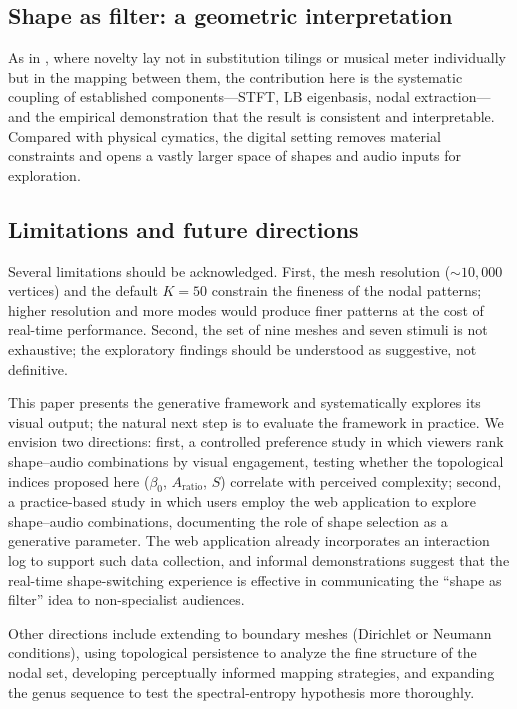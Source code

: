 \documentclass[]{interact}
\theoremstyle{plain}
\theoremstyle{definition}
\theoremstyle{remark}
\begin{document}
\subsection{Shape as filter: a geometric interpretation}

As in \citet{trevio2022}, where novelty lay not in substitution tilings or musical meter individually but in the mapping between them, the contribution here is the systematic coupling of established components---STFT, LB eigenbasis, nodal extraction---and the empirical demonstration that the result is consistent and interpretable. Compared with physical cymatics, the digital setting removes material constraints and opens a vastly larger space of shapes and audio inputs for exploration.

\subsection{Limitations and future directions}

Several limitations should be acknowledged. First, the mesh resolution (${\sim}10{,}000$ vertices) and the default $K=50$ constrain the fineness of the nodal patterns; higher resolution and more modes would produce finer patterns at the cost of real-time performance. Second, the set of nine meshes and seven stimuli is not exhaustive; the exploratory findings should be understood as suggestive, not definitive.

This paper presents the generative framework and systematically explores its visual output; the natural next step is to evaluate the framework in practice. We envision two directions: first, a controlled preference study in which viewers rank shape--audio combinations by visual engagement, testing whether the topological indices proposed here ($\beta_0$, $A_{\mathrm{ratio}}$, $S$) correlate with perceived complexity; second, a practice-based study in which users employ the web application to explore shape--audio combinations, documenting the role of shape selection as a generative parameter. The web application already incorporates an interaction log to support such data collection, and informal demonstrations suggest that the real-time shape-switching experience is effective in communicating the ``shape as filter'' idea to non-specialist audiences.

Other directions include extending to boundary meshes (Dirichlet or Neumann conditions), using topological persistence \citep{edelsbrunner2000} to analyze the fine structure of the nodal set, developing perceptually informed mapping strategies, and expanding the genus sequence to test the spectral-entropy hypothesis more thoroughly.
\end{document}

